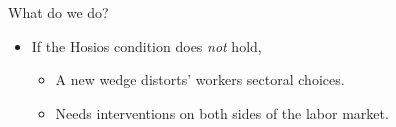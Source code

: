 \documentclass[9pt,xcolor={svgnames}]{beamer}
\begin{document}
\begin{frame}{What do we do?}
\begin{itemize}
\begin{itemize}
\vspace{2mm}
      
      \item If the Hosios condition does \textit{not} hold, %
        \begin{itemize}
          \item A new wedge distorts' workers sectoral choices.
          \item {Needs interventions on  both sides of the labor market.}
       
      \end{itemize}

      \vspace{2mm}

    \end{itemize}
\end{itemize}


\hyperlink{app:cardullo}{}


\end{frame}











    
\end{document}
